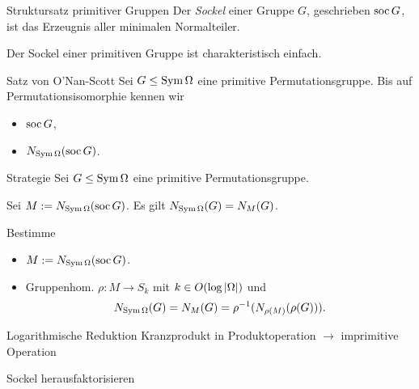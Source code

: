 \begin{frame}{Struktursatz primitiver Gruppen}
Der \emph{Sockel} einer Gruppe $G$, geschrieben
$\operatorname{soc} G$, ist das Erzeugnis aller minimalen Normalteiler.

Der Sockel einer primitiven Gruppe ist charakteristisch einfach.

\begin{block}{Satz von O'Nan-Scott}
Sei $G \leq \operatorname{Sym} \Omega$ eine primitive Permutationsgruppe.
Bis auf Permutationsisomorphie kennen wir
\begin{itemize}
\item $\operatorname{soc} G$,
\item $N_{\operatorname{Sym} \Omega}( \operatorname{soc} G )$.
\end{itemize}
\end{block}
\end{frame}


\begin{frame}{Strategie}
Sei $G \leq \operatorname{Sym} \Omega$ eine primitive Permutationsgruppe.

Sei $M := N_{\operatorname{Sym} \Omega}(\operatorname{soc} G)$.
Es gilt $N_{\operatorname{Sym} \Omega}(G) = N_M(G)$.

Bestimme
\begin{itemize}
\item $M := N_{\operatorname{Sym} \Omega}(\operatorname{soc} G)$.
\item Gruppenhom.
$
    \rho : M \to S_k
$
mit $k \in O(\log  \left| \Omega \right| )$
und
\[
    N_{\operatorname{Sym} \Omega}(G) = N_{M}(G) = \rho ^ {-1}( N_{\rho(M)}(\rho(G)) ).
\]
\end{itemize}
\end{frame}


\begin{frame}{Logarithmische Reduktion}
Kranzprodukt in Produktoperation
$\rightarrow$
imprimitive Operation

\pause
Sockel herausfaktorisieren
\end{frame}

